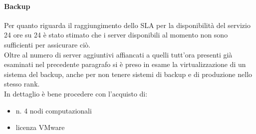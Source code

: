 \paragraph{Backup}
Per quanto riguarda il raggiungimento dello SLA per la disponibilità del servizio 24 ore su 24 è stato stimato che i server disponibili al momento non sono sufficienti per assicurare ciò. \\
Oltre al numero di server aggiuntivi affiancati a quelli tutt'ora presenti già esaminati nel precedente paragrafo si è preso in esame la virtualizzazione di un sistema del backup, anche per non tenere sistemi di backup e di produzione nello stesso rank. \\
In dettaglio è bene procedere con l'acquisto di:
\begin{itemize}
	\item n. 4 nodi computazionali 
	\item licenza VMware
\end{itemize}